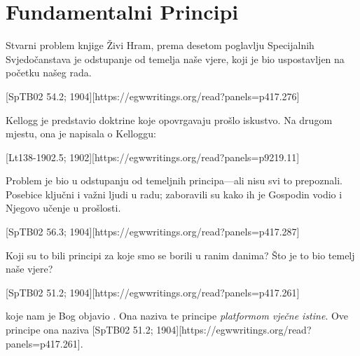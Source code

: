 \chapter{Fundamentalni Principi}

Stvarni problem knjige Živi Hram, prema desetom poglavlju Specijalnih Svjedočanstava je odstupanje od temelja naše vjere, koji je bio uspostavljen na početku našeg rada.

[SpTB02 54.2; 1904][https://egwwritings.org/read?panels=p417.276]

Kellogg je predstavio doktrine koje opovrgavaju prošlo iskustvo. Na drugom mjestu, ona je napisala o Kelloggu:

[Lt138-1902.5; 1902][https://egwwritings.org/read?panels=p9219.11]

Problem je bio u odstupanju od temeljnih principa—ali nisu svi to prepoznali. Posebice ključni i važni ljudi u radu; zaboravili su kako ih je Gospodin vodio i Njegovo učenje u prošlosti.

[SpTB02 56.3; 1904][https://egwwritings.org/read?panels=p417.287]

Koji su to bili principi za koje smo se borili u ranim danima? Što je to bio temelj naše vjere?

[SpTB02 51.2; 1904][https://egwwritings.org/read?panels=p417.261]

 koje nam je Bog objavio . Ona naziva te principe \textit{platformom vječne istine}. Ove principe ona naziva [SpTB02 51.2; 1904][https://egwwritings.org/read?panels=p417.261].

